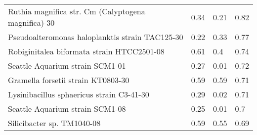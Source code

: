 \begin{table}
\begin{center}
\begin{tabularx}{\textwidth}{Xlll}
Ruthia magnifica str. Cm (Calyptogena magnifica)-30 & 0.34 & 0.21 & 0.82\\
Pseudoalteromonas haloplanktis strain TAC125-30 & 0.22 & 0.33 & 0.77\\
Robiginitalea biformata strain HTCC2501-08 & 0.61 & 0.4 & 0.74\\
Seattle Aquarium strain SCM1-01 & 0.27 & 0.01 & 0.72\\
Gramella forsetii strain KT0803-30 & 0.59 & 0.59 & 0.71\\
Lysinibacillus sphaericus strain C3-41-30 & 0.29 & 0.02 & 0.71\\
Seattle Aquarium strain SCM1-08 & 0.25 & 0.01 & 0.7\\
Silicibacter sp. TM1040-08 & 0.59 & 0.55 & 0.69\\

\bottomrule
\end{tabularx}
\end{center}
\end{table}
